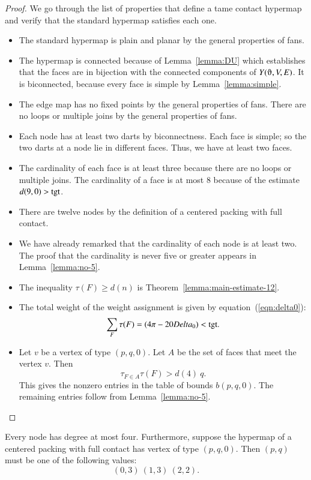 \begin{proof}  We go through the list of properties that define a tame contact hypermap and verify that the standard hypermap satisfies each one.

\begin{itemize}
\item The standard hypermap is plain and planar by the general properties of fans.
\item The hypermap is connected because of Lemma~\ref{lemma:DU} which establishes that the faces are in bijection with the connected components of $Y(\orgn,V,E)$.  It is biconnected, because every face is simple by Lemma~\ref{lemma:simple}.
\item The edge map has no fixed points by the general properties of fans.  There are no loops or multiple joins by the general properties of fans.
\item  Each node has at least two darts by biconnectness. Each face is simple; so the two darts at a node lie in different faces.  Thus, we have at least two faces.
\item The cardinality of each face is at least three because there are no loops or multiple joins.  The cardinality of a face is at most $8$ because of the estimate $d(9,0)>{\operatorname{tgt}}$.  
\item There are twelve nodes by the definition of a centered packing with full contact.
\item We have already remarked that the cardinality of each node is at least two.  The proof that the cardinality is never five or greater appears in Lemma~\ref{lemma:no-5}.
\item The inequality $\tau(F)\ge d(n)$ is Theorem~\ref{lemma:main-estimate-12}.
\item The total weight of the weight assignment is given by equation~(\ref{eqn:delta0}):
$$
\sum_F \tau(F) = (4\pi - 20Delta_0) < {\operatorname{tgt}}.
$$
\item Let $v$ be a vertex of type $(p,q,0)$.  Let $A$ be the set of faces that meet the vertex $v$. Then 
$$
\tau_{F\in A}\tau(F) > d(4)~q.
$$
This gives the nonzero entries in the table of bounds $b(p,q,0)$.  The remaining entries follow from Lemma~\ref{lemma:no-5}.
\end{itemize}
\end{proof}




\begin{lemma}\label{lemma:no-5} 
Every node has degree at most four.
Furthermore, suppose the hypermap of a centered packing with full contact has vertex of type $(p,q,0)$.  Then $(p,q)$ must be one of the following values:
$$
(0,3)~(1,3)~(2,2).
$$
\end{lemma}

